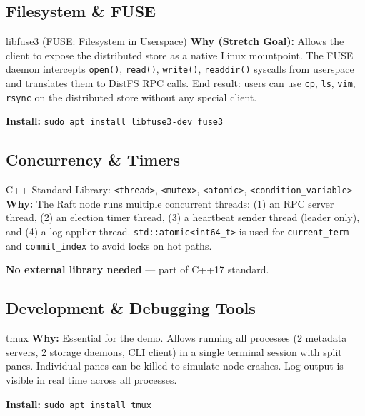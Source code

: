 \documentclass[12pt,a4paper]{article}
\begin{document}
\subsection{Filesystem \& FUSE}

\begin{toolbox}{libfuse3 (FUSE: Filesystem in Userspace)}
\textbf{Why (Stretch Goal):} Allows the client to expose the distributed store as a native Linux mountpoint. The FUSE daemon intercepts \texttt{open()}, \texttt{read()}, \texttt{write()}, \texttt{readdir()} syscalls from userspace and translates them to DistFS RPC calls. End result: users can use \texttt{cp}, \texttt{ls}, \texttt{vim}, \texttt{rsync} on the distributed store without any special client.

\textbf{Install:} \texttt{sudo apt install libfuse3-dev fuse3}
\end{toolbox}

\subsection{Concurrency \& Timers}

\begin{toolbox}{C++ Standard Library: \texttt{<thread>}, \texttt{<mutex>}, \texttt{<atomic>}, \texttt{<condition\_variable>}}
\textbf{Why:} The Raft node runs multiple concurrent threads: (1) an RPC server thread, (2) an election timer thread, (3) a heartbeat sender thread (leader only), and (4) a log applier thread. \texttt{std::atomic<int64\_t>} is used for \texttt{current\_term} and \texttt{commit\_index} to avoid locks on hot paths.

\textbf{No external library needed} — part of C++17 standard.
\end{toolbox}

\subsection{Development \& Debugging Tools}

\begin{toolbox}{tmux}
\textbf{Why:} Essential for the demo. Allows running all processes (2 metadata servers, 2 storage daemons, CLI client) in a single terminal session with split panes. Individual panes can be killed to simulate node crashes. Log output is visible in real time across all processes.

\textbf{Install:} \texttt{sudo apt install tmux}
\end{toolbox}
\end{document}
